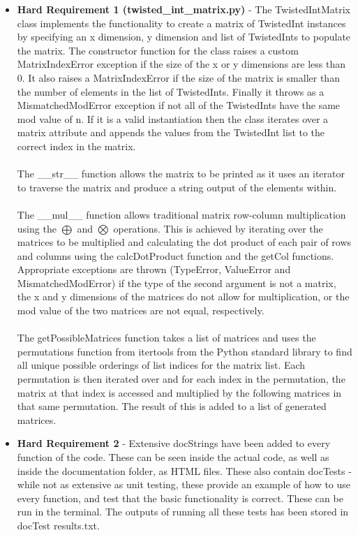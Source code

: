 \documentclass[11]{article}
\begin{document}
\begin{itemize}
		\item \textbf{Hard Requirement 1 (twisted\_int\_matrix.py)} - The TwistedIntMatrix class implements the functionality to create a matrix of TwistedInt instances by specifying an x dimension, y dimension and list of TwistedInts to populate the matrix. The constructor function for the class raises a custom MatrixIndexError exception if the size of the x or y dimensions are less than 0. It also raises a MatrixIndexError if the size of the matrix is smaller than the number of elements in the list of TwistedInts. Finally it throws as a MismatchedModError exception if not all of the TwistedInts  have the same mod value of n. If it is a valid instantiation then the class iterates over a matrix attribute and appends the values from the TwistedInt list to the correct index in the matrix. \\\\ The \_\_str\_\_ function allows the matrix to be printed as it uses an iterator to traverse the matrix and produce a string output of the elements within. \\\\ The \_\_mul\_\_ function allows traditional matrix row-column multiplication using the $\bigoplus$ and $\bigotimes$ operations. This is achieved by iterating over the matrices to be multiplied and calculating the dot product of each pair of rows and columns using the calcDotProduct function and the getCol functions. Appropriate exceptions are thrown (TypeError, ValueError and MismatchedModError) if the type of the second argument is not a matrix, the x and y dimensions of the matrices do not allow for multiplication, or the mod value of the two matrices are not equal, respectively. \\\\ The getPossibleMatrices function takes a list of matrices and uses the permutations function from itertools from the Python standard library to find all unique possible orderings of list indices for the matrix list. Each permutation is then iterated over and for each index in the permutation, the matrix at that index is accessed and multiplied by the following matrices in that same permutation. The result of this is added to a list of generated matrices.
		
		\item \textbf{Hard Requirement 2} - Extensive docStrings have been added to every function of the code. These can be seen inside the actual code, as well as inside the documentation folder, as HTML files. These also contain docTests - while not as extensive as unit testing, these provide an example of how to use  every function, and test that the basic functionality is correct. These can be run in the terminal. The outputs of running all these tests has been stored in docTest results.txt.		
		\end{itemize}
		
\end{document}

